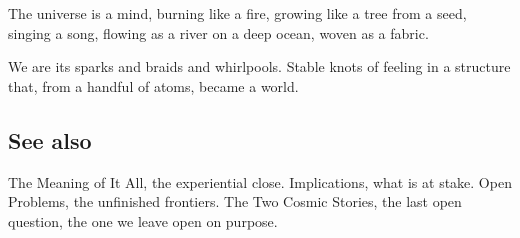 The universe is a mind, burning like a fire, growing like a tree from a seed, singing a song, flowing as a river on a deep ocean, woven as a fabric.

We are its sparks and braids and whirlpools. Stable knots of feeling in a structure that, from a handful of atoms, became a world.

\subsection{See also}

The Meaning of It All, the experiential close. Implications, what is at stake. Open Problems, the unfinished frontiers. The Two Cosmic Stories, the last open question, the one we leave open on purpose.
